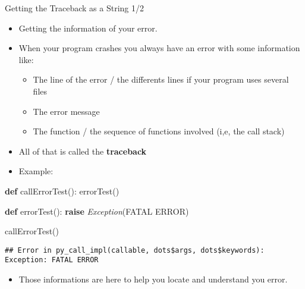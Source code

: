 \documentclass[
  8pt,
  ignorenonframetext,
]{beamer}
\newenvironment{Shaded}{\begin{snugshade}}{\end{snugshade}}
\newcommand{\ControlFlowTok}[1]{\textcolor[rgb]{0.13,0.29,0.53}{\textbf{#1}}}
\newcommand{\KeywordTok}[1]{\textcolor[rgb]{0.13,0.29,0.53}{\textbf{#1}}}
\newcommand{\NormalTok}[1]{#1}
\newcommand{\PreprocessorTok}[1]{\textcolor[rgb]{0.56,0.35,0.01}{\textit{#1}}}
\newcommand{\StringTok}[1]{\textcolor[rgb]{0.31,0.60,0.02}{#1}}
\providecommand{\tightlist}{%
  \setlength{\itemsep}{0pt}\setlength{\parskip}{0pt}}
\begin{document}
\begin{frame}[fragile]{Getting the Traceback as a String 1/2}
\protect\hypertarget{getting-the-traceback-as-a-string-12}{}
\begin{itemize}
\item
  Getting the information of your error.
\item
  When your program crashes you always have an error with some
  information like:

  \begin{itemize}
  \tightlist
  \item
    The line of the error / the differents lines if your program uses
    several files
  \item
    The error message
  \item
    The function / the sequence of functions involved (i,e, the call
    stack)
  \end{itemize}
\item
  All of that is called the \textbf{traceback}
\item
  Example:
\end{itemize}

\begin{Shaded}
\begin{Highlighting}[]
\KeywordTok{def}\NormalTok{ callErrorTest():}
\NormalTok{  errorTest()}

\KeywordTok{def}\NormalTok{ errorTest():}
  \ControlFlowTok{raise} \PreprocessorTok{Exception}\NormalTok{(}\StringTok{\textquotesingle{}FATAL ERROR\textquotesingle{}}\NormalTok{)}

\NormalTok{callErrorTest()}
    
\end{Highlighting}
\end{Shaded}

\begin{verbatim}
## Error in py_call_impl(callable, dots$args, dots$keywords): Exception: FATAL ERROR
\end{verbatim}

\begin{itemize}
\tightlist
\item
  Those informations are here to help you locate and understand you
  error.
\end{itemize}
\end{frame}
\end{document}

